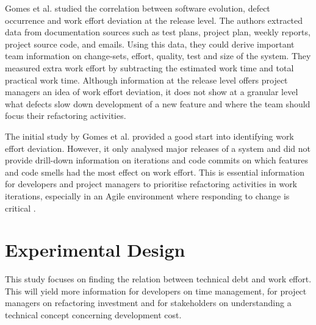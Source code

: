 Gomes et al. \cite{Gomes2011} studied the correlation between software
evolution, defect occurrence and work effort deviation at the release level. The
authors extracted data from documentation sources such as test plans, project
plan, weekly reports, project source code, and emails. Using this data, they
could derive important team information on change-sets, effort, quality, test and
size of the system. They measured extra work effort by subtracting the estimated
work time and total practical work time. Although information at the release
level offers project managers an idea of work effort deviation, it does not show
at a granular level what defects slow down development of a new feature and
where the team should focus their refactoring activities.

The initial study by Gomes et al. \cite{Gomes2011} provided a good start into
identifying work effort deviation. However, it only analysed major releases of a
system and did not provide drill-down information on iterations and code commits
on which features and code smells had the most effect on work effort. This is
essential information for developers and project managers to prioritise
refactoring activities in work iterations, especially in an Agile environment
where responding to change is critical \cite{agile-manifesto}.

\section{Experimental Design}
\label{work-plan}

This study focuses on finding the relation between technical debt and work
effort. This will yield more information for developers on time management, for
project managers on refactoring investment and for stakeholders on understanding
a technical concept concerning development cost.

